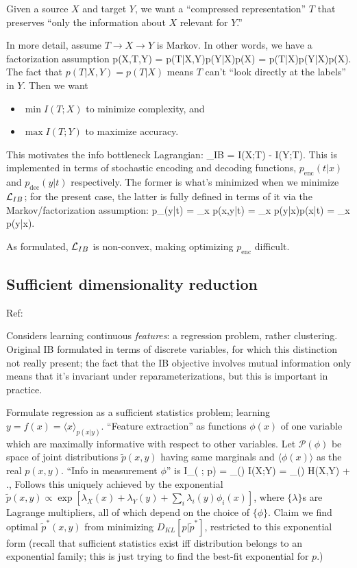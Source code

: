 \documentclass[notitlepage,openany,11pt]{report}
\theoremstyle{plain}%
\numberwithin{equation}{section}
\begin{document}
Given a source $X$ and target $Y$, we want a ``compressed representation'' $T$ that preserves ``only the information about $X$ relevant for $Y$.'' 

In more detail, assume $T \rightarrow X \rightarrow Y$ is Markov. In other words, we have a factorization assumption
\be
p(X,T,Y) = p(T|X,Y)p(Y|X)p(X) = p(T|X)p(Y|X)p(X).
\ee
The fact that $p(T|X,Y) = p(T|X)$ means $T$ can't ``look directly at the labels'' in $Y$. Then we want 
\begin{itemize}
\item $\min I(T;X)$ to minimize complexity, and
\item $\max I(T;Y)$ to maximize accuracy.
\end{itemize}
This motivates the info bottleneck Lagrangian:
\be
{}_{IB} = I(X;T) - \beta I(Y;T).
 This is implemented in terms of stochastic encoding and decoding functions, $p_{\text{enc}}(t|x)$ and $p_{\text{dec}}(y|t)$ respectively. The former is what's minimized when we minimize $\mcal{L}_{IB}$; for the present case, the latter is fully defined in terms of it via the Markov/factorization assumption:
\be
p_{}(y|t) = \sum_{x} p(x,y|t) = \sum_{x} p(y|x)p(x|t) = \sum_{x} p(y|x).
\ee

As formulated, $\mathcal{L}_{IB}$ is non-convex, making optimizing $p_{\text{enc}}$ difficult.


\subsection{Sufficient dimensionality reduction}
Ref: \cite{GlobersonTishby:03}

Considers learning continuous \emph{features}: a regression problem, rather clustering. Original IB formulated in terms of discrete variables, for which this distinction not really present; the fact that the IB objective involves mutual information only means that it's invariant under reparameterizations, but this is important in practice.

Formulate regression as a sufficient statistics problem; learning $y = f(x) = \langle x \rangle_{p(x|y)}$. ``Feature extraction'' as functions $\phi(x)$ of one variable which are maximally informative with respect to other variables. Let $\mathcal{P}(\phi)$ be space of joint distributions $\widetilde{p}(x,y)$ having same marginals and $\langle \phi(x) \rangle$ as the real $p(x,y)$. ``Info in measurement $\phi$'' is 
\be
I_{}( \phi; p) = \min_{(\phi)} I(X;Y) = \max_{(\phi)} H(X,Y) + ., 
\ee
Follows this uniquely achieved by the exponential $\widetilde{p}(x,y) \propto \exp \left[\lambda_{X}(x) + \lambda_{Y}(y) + \sum_{i} \lambda_{i}(y) \phi_{i}(x)\right]$, where $\{\lambda\}$s are Lagrange multipliers, all of which depend on the choice of $\{\phi\}$. Claim we find optimal $\widetilde{p}^{\ast}(x,y)$ from minimizing $D_{KL}[p | \widetilde{p}^{\ast}]$, restricted to this exponential form (recall that sufficient statistics exist iff distribution belongs to an exponential family; this is just trying to find the best-fit exponential for $p$.)
\end{document}
